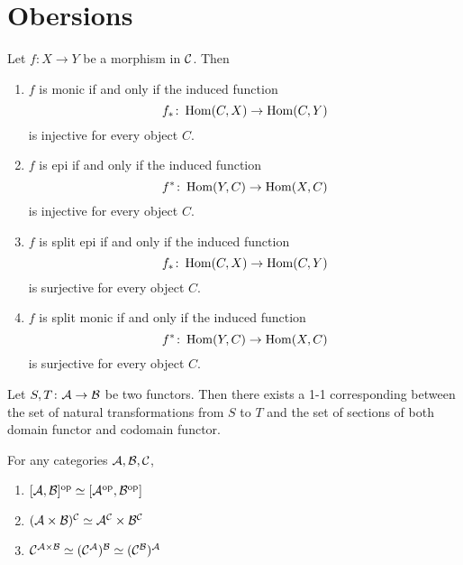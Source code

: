 \newpage\section{Obersions}
\begin{ex}
  Let $f\colon X\to Y$ be a morphism in ${\cal C}$. Then
  \begin{enumerate}
    \item $f$ is monic if and only if the induced function
               \begin{equation*}
                 f_{\ast}\colon\operatorname{Hom}(C,X)\to\operatorname{Hom}(C,Y)
               \end{equation*}
               is injective for every object $C$.
    \item $f$ is epi if and only if the induced function
               \begin{equation*}
                 f^{\ast}\colon\operatorname{Hom}(Y,C)\to\operatorname{Hom}(X,C)
               \end{equation*}
               is injective for every object $C$.
    \item $f$ is split epi if and only if the induced function
               \begin{equation*}
                 f_{\ast}\colon\operatorname{Hom}(C,X)\to\operatorname{Hom}(C,Y)
               \end{equation*}
               is surjective for every object $C$.
    \item $f$ is split monic if and only if the induced function
               \begin{equation*}
                 f^{\ast}\colon\operatorname{Hom}(Y,C)\to\operatorname{Hom}(X,C)
               \end{equation*}
               is surjective for every object $C$.
  \end{enumerate}
\end{ex}
\begin{ex}
  Let $S,T\colon{\cal A}\to{\cal B}$ be two functors. Then there exists a 1-1 corresponding between the set of natural transformations from $S$ to $T$ and the set of sections of both domain functor and codomain functor.
\end{ex}
\begin{ex}\label{prop:power law for functor}
  For any categories ${\cal A},{\cal B},{\cal C}$,
  \begin{enumerate}
    \item $[{\cal A},{\cal B}]^{\operatorname{op}}\simeq[{\cal A}^{\operatorname{op}},{\cal B}^{\operatorname{op}}]$
    \item $({\cal A}\times{\cal B})^{{\cal C}}\simeq{\cal A}^{{\cal C}}\times{\cal B}^{{\cal C}}$
    \item ${\cal C}^{{\cal A}\times{\cal B}}\simeq({\cal C}^{{\cal A}})^{{\cal B}}\simeq({\cal C}^{{\cal B}})^{{\cal A}}$
  \end{enumerate}
\end{ex}
